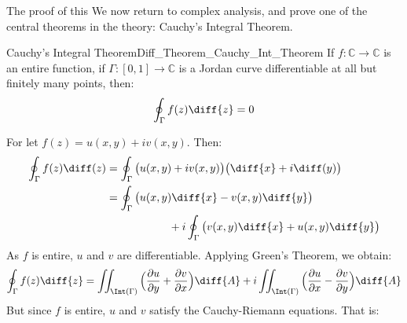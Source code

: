 \documentclass[crop=false,class=book,oneside]{standalone}
\begin{document}
            The proof of this We now return to complex analysis, and prove one of the
            central theorems in the theory: Cauchy's Integral Theorem.
            \begin{ftheorem}{Cauchy's Integral Theorem}{Diff_Theorem_Cauchy_Int_Theorem}
                If $f:\mathbb{C}\rightarrow\mathbb{C}$ is an
                entire function, if
                $\Gamma:[0,1]\rightarrow\mathbb{C}$ is a
                Jordan curve differentiable at all but finitely
                many points, then:
                \begin{equation}
                    \oint_{\Gamma}f(z)\diff{z}=0
                \end{equation}
            \end{ftheorem}
            \begin{bproof}
                For let $f(z)=u(x,y)+iv(x,y)$. Then:
                \begin{subequations}
                    \begin{align}
                        \oint_{\Gamma}f(z)\diff(z)
                        &=\oint_{\Gamma}\big(u(x,y)+iv(x,y)\big)
                        \big(\diff{x}+i\diff(y)\big)\\
                        \nonumber&=\oint_{\Gamma}
                        \big(u(x,y)\diff{x}-v(x,y)\diff{y}\big)\\
                        &\hspace{2cm}+i\oint_{\Gamma}
                        \big(v(x,y)\diff{x}+u(x,y)\diff{y}\big)
                    \end{align}
                \end{subequations}
                As $f$ is entire, $u$ and $v$ are differentiable.
                Applying Green's Theorem, we obtain:
                \begin{equation}
                    \oint_{\Gamma}f(z)\diff{z}
                    =\iint_{\Int(\Gamma)}
                    \Big(\frac{\partial{u}}{\partial{y}}+
                         \frac{\partial{v}}{\partial{x}}\Big)\diff{A}+
                    i\iint_{\Int(\Gamma)}
                    \Big(\frac{\partial{u}}{\partial{x}}-
                         \frac{\partial{v}}{\partial{y}}\Big)\diff{A}
                \end{equation}
                But since $f$ is entire, $u$ and $v$ satisfy
                the Cauchy-Riemann equations. That is:
                \par\hfill\par

\end{bproof}
\end{document}
